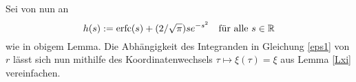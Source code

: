 \documentclass[12pt,a4paper]{scrartcl}
\newtheorem{Lemma}[Satz]{Lemma}
\numberwithin{equation}{section}
\newcommand{\R}{\mathbb{R}} %
\newcommand{\erfc}{\operatorname{erfc}}
\newcommand{\fa}{\text{\quad für alle }}
\begin{document}
Sei von nun an 
\[
h(s):=\erfc(s)+(2/\sqrt{\pi})s e ^{-s^2 } \fa s\in \R
\] wie in obigem Lemma.
Die Abhängigkeit des Integranden in Gleichung \eqref{eps1} von $r$ lässt sich nun mithilfe des Koordinatenwechsels $\tau \mapsto \xi(\tau)=\xi$ aus Lemma \ref{Lxi} vereinfachen.
%
%
%
%
%
%
\end{document}
